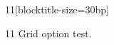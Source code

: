 \documentclass[paper=A4]{ropas-poster}
\begin{document}
\begin{postergrid}{1}{1}[blocktitle-size=30bp]
\begin{posterblock}{1}{1}
Grid option test.
\end{posterblock}
\end{postergrid}
\end{document}
